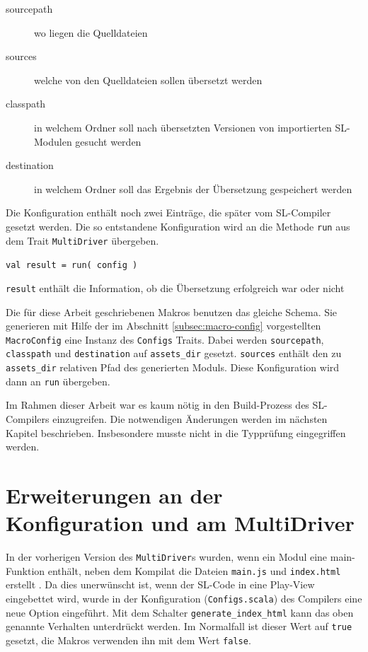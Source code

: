 \documentclass[12pt,bibtotoc]{scrreprt}
\begin{document}
\begin{description}
 \item[sourcepath]{wo liegen die Quelldateien}
 \item[sources]{welche von den Quelldateien sollen übersetzt werden}
 \item[classpath]{in welchem Ordner soll nach übersetzten Versionen von importierten SL-Modulen gesucht werden}
 \item[destination]{in welchem Ordner soll das Ergebnis der Übersetzung gespeichert werden}
\end{description}

Die Konfiguration enthält noch zwei Einträge, die später vom SL-Compiler gesetzt werden. Die so entstandene Konfiguration wird an die Methode \lstinline!run! aus dem Trait \lstinline!MultiDriver! \cite[S. 16-19]{Bisping2013} übergeben.

\begin{centering}
\lstinline!val result = run( config )!\\
\end{centering}

\lstinline!result! enthält die Information, ob die Übersetzung erfolgreich war oder nicht

Die für diese Arbeit geschriebenen Makros benutzen das gleiche Schema. Sie generieren mit Hilfe der im Abschnitt \ref{subsec:macro-config} vorgestellten \lstinline!MacroConfig! eine Instanz des \lstinline!Configs! Traits. Dabei werden \lstinline!sourcepath!, \lstinline!classpath! und \lstinline!destination! auf \lstinline!assets_dir! gesetzt. \lstinline!sources! enthält den zu \lstinline!assets_dir! relativen Pfad des generierten Moduls. Diese Konfiguration wird dann an \lstinline!run! übergeben.

Im Rahmen dieser Arbeit war es kaum nötig in den Build-Prozess\cite[S. 16-19]{Bisping2013} des SL-Compilers einzugreifen. Die notwendigen Änderungen werden im nächsten Kapitel beschrieben. Insbesondere musste nicht in die Typprüfung eingegriffen werden.

\section{Erweiterungen an der Konfiguration und am MultiDriver}

In der vorherigen Version des \lstinline!MultiDriver!s wurden, wenn ein Modul eine main-Funktion enthält, neben dem Kompilat die Dateien \lstinline!main.js! und \lstinline!index.html! erstellt \cite[S. 18-19]{Bisping2013}. Da dies unerwünscht ist, wenn der \ac{SL}-Code in eine Play-View eingebettet wird, wurde in der Konfiguration (\lstinline!Configs.scala!) des Compilers eine neue Option eingeführt. Mit dem Schalter \lstinline!generate_index_html! kann das oben genannte Verhalten unterdrückt werden. Im Normalfall ist dieser Wert auf \lstinline!true! gesetzt, die Makros verwenden ihn mit dem Wert \lstinline!false!.
\end{document}

